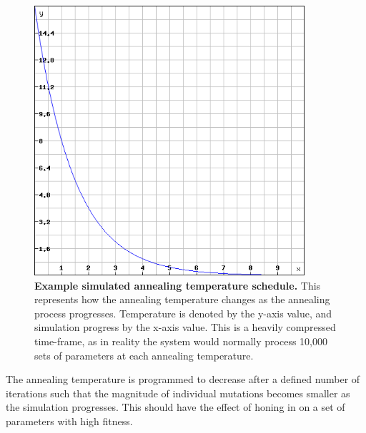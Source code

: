 \begin{figure}[tbp]
	\begin{center}
		\includegraphics[height=10cm]{03-parameterestimationmethodologies/data/temperature.png}
	\caption[Example simulated annealing temperature schedule]{{\bf Example simulated annealing temperature schedule.} This represents how the annealing temperature changes as the annealing process progresses. Temperature is denoted by the y-axis value, and simulation progress by the x-axis value. This is a heavily compressed time-frame, as in reality the system would normally process 10,000 sets of parameters at each annealing temperature.
	\label{fig:temperature}}
	\end{center}
\end{figure}
The annealing temperature is programmed to decrease after a defined number of iterations such that the magnitude of individual mutations becomes smaller as the simulation progresses. This should have the effect of honing in on a set of parameters with high fitness.
